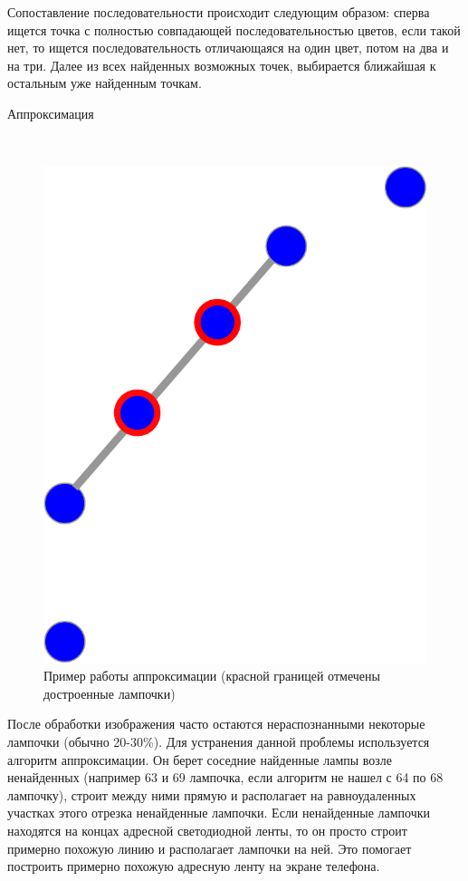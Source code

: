 Сопоставление последовательности происходит следующим образом: сперва ищется точка с полностью совпадающей последовательностью цветов, если такой нет, то ищется последовательность отличающаяся на один цвет, потом на два и на три. Далее из всех найденных возможных точек, выбирается ближайшая к остальным уже найденным точкам.

Аппроксимация
\label{sec:develop:algorithm:approximation}

~
\begin{figure}[H]
\centering
	\includegraphics[scale=0.45]{figures/calibration/approximation.pdf}
	\caption{Пример работы аппроксимации (красной границей отмечены достроенные лампочки)}
	\label{fig:develop:algorithm:approximation}
\end{figure}

После обработки изображения часто остаются нераспознанными некоторые лампочки (обычно 20-30\%). Для устранения данной проблемы используется алгоритм аппроксимации. Он берет соседние найденные лампы возле ненайденных (например 63 и 69 лампочка, если алгоритм не нашел с 64 по 68 лампочку), строит между ними прямую и располагает на равноудаленных участках этого отрезка ненайденные лампочки. Если ненайденные лампочки находятся на концах адресной светодиодной ленты, то он просто строит примерно похожую линию и располагает лампочки на ней. Это помогает построить примерно похожую адресную ленту на экране телефона.
